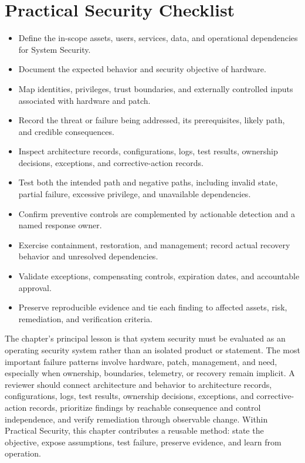\documentclass[11pt]{article}
\begin{document}
\section*{Practical Security Checklist}
\begin{itemize}[label=$\square$]
\item Define the in-scope assets, users, services, data, and operational dependencies for System Security.
\item Document the expected behavior and security objective of hardware.
\item Map identities, privileges, trust boundaries, and externally controlled inputs associated with hardware and patch.
\item Record the threat or failure being addressed, its prerequisites, likely path, and credible consequences.
\item Inspect architecture records, configurations, logs, test results, ownership decisions, exceptions, and corrective-action records.
\item Test both the intended path and negative paths, including invalid state, partial failure, excessive privilege, and unavailable dependencies.
\item Confirm preventive controls are complemented by actionable detection and a named response owner.
\item Exercise containment, restoration, and management; record actual recovery behavior and unresolved dependencies.
\item Validate exceptions, compensating controls, expiration dates, and accountable approval.
\item Preserve reproducible evidence and tie each finding to affected assets, risk, remediation, and verification criteria.
\end{itemize}
\begin{synthesisbox}
The chapter's principal lesson is that system security must be evaluated as an operating security system rather than an isolated product or statement. The most important failure patterns involve hardware, patch, management, and need, especially when ownership, boundaries, telemetry, or recovery remain implicit. A reviewer should connect architecture and behavior to architecture records, configurations, logs, test results, ownership decisions, exceptions, and corrective-action records, prioritize findings by reachable consequence and control independence, and verify remediation through observable change. Within Practical Security, this chapter contributes a reusable method: state the objective, expose assumptions, test failure, preserve evidence, and learn from operation.
\end{synthesisbox}
\end{document}
